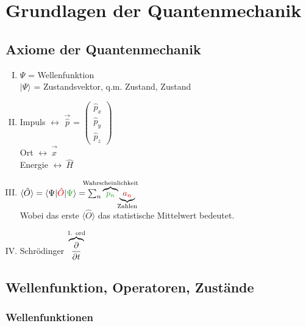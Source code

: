 
\chapter{Grundlagen der Quantenmechanik}


\section{Axiome der Quantenmechanik}

\begin{enumerate}[I)]
	\item $\Psi$ = Wellenfunktion\\
	$\vert\Psi\rangle$ = Zustandsvektor, q.m. Zustand, Zustand
	\item Impuls $\leftrightarrow$ $\vec{\hat p}$ = $\begin{pmatrix} \hat p_x \\ \hat p_y \\ \hat p_z \end{pmatrix}$\\
	Ort $\leftrightarrow\ \vec{\hat x}$\\
	Energie $\leftrightarrow\ \hat H$
	\item $\langle \hat O \rangle = \langle \Psi \vert \color{black!20!red}\hat O \color{black}\vert \color{black!30!green} \Psi \color{black}\rangle = \sum_n \overbrace{\color{black!30!green}p_n}^{\mathclap{\tx{Wahrscheinlichkeit}}} \underbrace{\color{black!20!red}a_n}_{\mathclap{\tx{Zahlen}}}$\\
	Wobei das erste $\langle \hat O \rangle$ das statistische Mittelwert bedeutet. \\
	\item Schrödinger $\overbrace{\frac{\partial }{\partial t}}^{\textrm{1. ord}}$
\end{enumerate}

\section{Wellenfunktion, Operatoren, Zustände}

\subsection{Wellenfunktionen}

